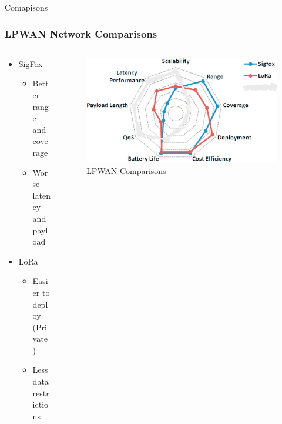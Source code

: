 \documentclass{beamer}
\begin{document}
\begin{frame}{Comapisons}
  \frametitle{LPWAN Network Comparisons}
  \begin{columns}
    \begin{column}{0.5\textwidth}
      \begin{itemize}
        \item SigFox
        \begin{itemize}
          \item Better range and coverage
          \item Worse latency and payload
        \end{itemize}
        \item LoRa
        \begin{itemize}
          \item Easier to deploy (Private)
          \item Less data restrictions
        \end{itemize}
      \end{itemize}
    \end{column}
    \begin{column}{0.5\textwidth}
      \begin{figure}[htbp]
        \centering
        \includegraphics[width=\textwidth]{LPWAN_comparisons.png}
        \caption{LPWAN Comparisons \cite{mekki2019comparative}}
        \label{fig:LPWAN_Comparisons_map}
      \end{figure}
    \end{column}
  \end{columns}
\end{frame}
\end{document}
